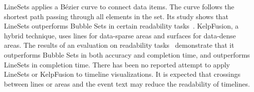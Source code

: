 LineSets applies a B\'{e}zier curve to connect data items. The curve follows the shortest path passing through all elements in the set. Its study shows that LineSets outperforms Bubble Sets in certain readability tasks~\cite{Alper2011}. KelpFusion, a hybrid technique, uses lines for data-sparse areas and surfaces for data-dense areas. The results of an evaluation on readability tasks~\cite{Meulemans2013} demonstrate that it outperforms Bubble Sets in both accuracy and completion time, and outperforms LineSets in completion time. There has been no reported attempt to apply LineSets or KelpFusion to timeline visualizations. It is expected that crossings between lines or areas and the event text may reduce the readability of timelines.